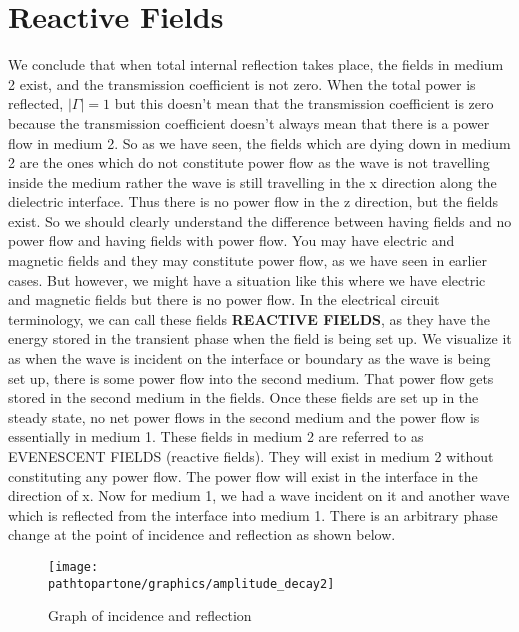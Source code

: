 \section{Reactive Fields}

We conclude that when total internal reflection takes place, the fields in medium 2 exist, and the transmission coefficient is not zero. When the total power is reflected, $|\Gamma| = 1$ but this doesn't mean that the transmission coefficient is zero because the transmission coefficient doesn't always mean that there is a power flow in medium 2. So as we have seen, the fields which are dying down in medium 2 are the ones which do not constitute power flow as the wave is not travelling inside the medium rather the wave is still travelling in the x direction along the dielectric interface. Thus there is no power flow in the z direction, but the fields exist. So we should clearly understand the difference between having fields and no power flow and having fields with power flow. You may have electric and magnetic fields and they may constitute power flow, as we have seen in earlier cases. But however, we might have a situation like this where we have electric and magnetic fields but there is no power flow. In the electrical circuit terminology, we can call these fields \textbf{ REACTIVE FIELDS}, as they have the energy stored in the transient phase when the field is being set up. We visualize it as when the wave is incident on the interface or boundary as the wave is being set up, there is some power flow into the second medium. That power flow gets stored in the second medium in the fields. Once these fields are set up in the steady state, no net power flows in the second medium and the power flow is essentially in medium 1. These fields in medium 2 are referred to as EVENESCENT FIELDS (reactive fields). They will exist in medium 2 without constituting any power flow. The power flow will exist in the interface in the direction of x. 
Now for medium 1, we had a wave incident on it and another wave which is reflected from the interface into medium 1. There is an arbitrary phase change at the point of incidence and reflection as shown below.
\begin{figure}[h]
\centering
\texttt{[image: \\pathtopartone/graphics/amplitude\_decay2]}
\caption{Graph of incidence and reflection}
\end{figure}

